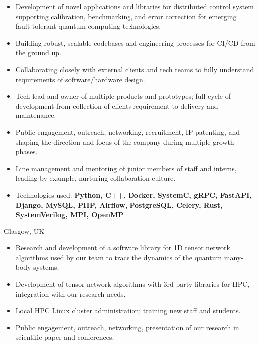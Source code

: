 \documentclass[10pt,a4paper,ragged2e,withhyper]{altacv}
\begin{document}
\begin{paracol}{2}
\begin{itemize}
    \item Development of novel applications and libraries for
    distributed control system supporting calibration, benchmarking,
    and error correction for emerging fault-tolerant quantum computing
    technologies.

    \item Building robust, scalable codebases and engineering processes for
    CI/CD from the ground up.

    \item Collaborating closely with external clients and tech teams to fully
    understand requirements of software/hardware design.

    \item Tech lead and owner of multiple products and prototypes;
    full cycle of development from collection of clients requirement to
    delivery and maintenance.

    \item Public engagement, outreach, networking, recruitment, IP patenting,
    and shaping the direction and focus of the company during multiple growth
    phases.

    \item Line management and mentoring of junior members of staff and interns,
    leading by example, nurturing collaboration culture.

    \item Technologies used:
    {\bf Python, C++, Docker, SystemC, gRPC, FastAPI, Django, MySQL, PHP,
    Airflow, PostgreSQL, Celery, Rust, SystemVerilog, MPI, OpenMP}
\end{itemize}

\divider

{Glasgow, UK}

\begin{itemize}
    \item Research and development of a software library for 1D tensor network
    algorithms used by our team to trace the dynamics of the quantum many-body
    systems.

    \item Development of tensor network algorithms with 3rd party libraries
    for HPC, integration with our research needs.

    \item Local HPC Linux cluster administration;
    training new staff and students.

    \item Public engagement, outreach, networking, presentation of our research
    in scientific paper and conferences.
    

\end{itemize}
\end{paracol}
\end{document}
